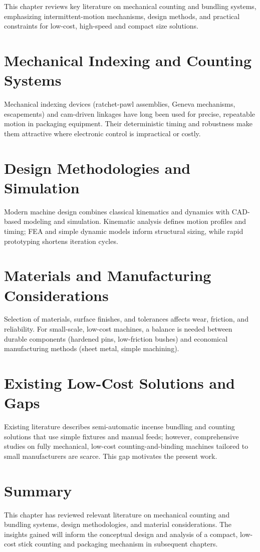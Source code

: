 This chapter reviews key literature on mechanical counting and bundling systems, emphasizing intermittent-motion mechanisms, design methods, and practical constraints for low-cost, high-speed and compact size solutions.

\section{Mechanical Indexing and Counting Systems}
Mechanical indexing devices (ratchet-pawl assemblies, Geneva mechanisms, escapements) and cam-driven linkages have long been used for precise, repeatable motion in packaging equipment. Their deterministic timing and robustness make them attractive where electronic control is impractical or costly.

\section{Design Methodologies and Simulation}
Modern machine design combines classical kinematics and dynamics with CAD-based modeling and simulation. Kinematic analysis defines motion profiles and timing; FEA and simple dynamic models inform structural sizing, while rapid prototyping shortens iteration cycles.

\section{Materials and Manufacturing Considerations}
Selection of materials, surface finishes, and tolerances affects wear, friction, and reliability. For small-scale, low-cost machines, a balance is needed between durable components (hardened pins, low-friction bushes) and economical manufacturing methods (sheet metal, simple machining).

\section{Existing Low-Cost Solutions and Gaps}
Existing literature describes semi-automatic incense bundling and counting solutions that use simple fixtures and manual feeds; however, comprehensive studies on fully mechanical, low-cost counting-and-binding machines tailored to small manufacturers are scarce. This gap motivates the present work.

\section*{Summary}
This chapter has reviewed relevant literature on mechanical counting and bundling systems, design methodologies, and material considerations. The insights gained will inform the conceptual design and analysis of a compact, low-cost stick counting and packaging mechanism in subsequent chapters.